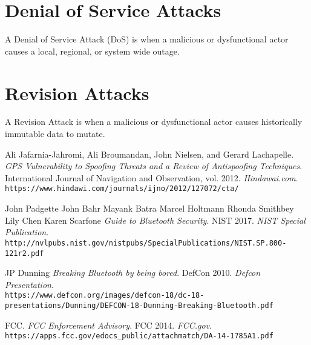 \documentclass{article}
\begin{document}
\section{Denial of Service Attacks}
A Denial of Service Attack (DoS) is when a malicious or dysfunctional actor causes a local, regional, or system wide outage.

\section{Revision Attacks}
A Revision Attack is when a malicious or dysfunctional actor causes historically immutable data to mutate.

\begin{thebibliography}{9}

Ali Jafarnia-Jahromi, Ali Broumandan, John Nielsen, and Gerard Lachapelle.
\textit{GPS Vulnerability to Spoofing Threats and a Review of Antispoofing Techniques}.
International Journal of Navigation and Observation, vol. 2012.
\textit{Hindawai.com}.
\\\texttt{https://www.hindawi.com/journals/ijno/2012/127072/cta/}

John Padgette John Bahr Mayank Batra Marcel Holtmann Rhonda Smithbey Lily Chen Karen Scarfone
\textit{Guide to Bluetooth Security}.
NIST 2017.
\textit{NIST Special Publication}.
\\\texttt{http://nvlpubs.nist.gov/nistpubs/SpecialPublications/NIST.SP.800-121r2.pdf}

JP Dunning
\textit{Breaking Bluetooth by being bored}.
DefCon 2010.
\textit{Defcon Presentation}.
\\\texttt{https://www.defcon.org/images/defcon-18/dc-18-presentations\-/Dunning/DEFCON-18-Dunning-Breaking-Bluetooth.pdf}

FCC.
\textit{FCC Enforcement Advisory}.
FCC 2014.
\textit{FCC.gov}.
\\\texttt{https://apps.fcc.gov/edocs\_public/attachmatch/DA-14-1785A1.pdf}


\end{thebibliography}
\printglossaries

\end{document}
